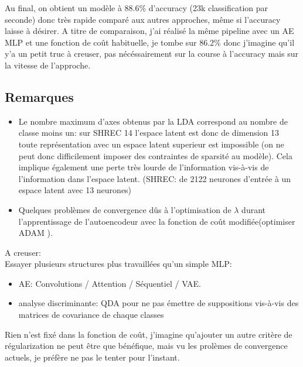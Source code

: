 Au final, on obtient un modèle à 88.6\% d'accuracy (23k classification par seconde) donc très rapide comparé aux autres approches, même si l'accuracy laisse à désirer. A titre de comparaison, j'ai réalisé la même pipeline avec un AE MLP et une fonction de coût habituelle, je tombe sur 86.2\% donc j'imagine qu'il y'a un petit truc à creuser, pas nécéssairement sur la course à l'accuracy mais sur la vitesse de l'approche.

\subsection{Remarques}
\begin{itemize}
    \item Le nombre maximum d'axes obtenus par la LDA correspond au nombre de classe moins un: sur SHREC 14 l'espace latent est donc de dimension 13 toute représentation avec un espace latent superieur est impossible (on ne peut donc difficilement imposer des contraintes de sparsité au modèle). Cela implique également une perte très lourde de l'information vis-à-vis de l'information dans l'espace latent. (SHREC: de 2122 neurones d'entrée à un espace latent avec 13 neurones)
    \item Quelques problèmes de convergence dûs à l'optimisation de $\lambda$ durant l'apprentissage de l'autoencodeur avec la fonction de coût modifiée(optimiser ADAM \cite{kingma2014adam}).
\end{itemize}

A creuser:\\
Essayer plusieurs structures plus travaillées qu'un simple MLP:
\begin{itemize}
    \item AE: Convolutions / Attention / Séquentiel / VAE.
    \item analyse discriminante: QDA  pour ne pas émettre de suppositions vis-à-vis des matrices de covariance de chaque classes
\end{itemize}

Rien n'est fixé dans la fonction de coût, j'imagine qu'ajouter un autre critère de régularization ne peut être que bénéfique, mais vu les prolèmes de convergence actuels, je préfère ne pas le tenter pour l'instant.

